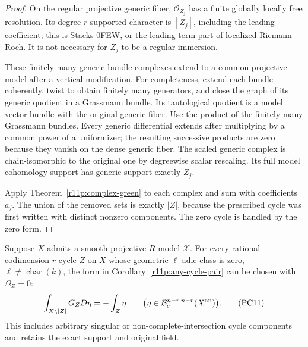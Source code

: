\begin{proof}
On the regular projective generic fiber, $\mathcal O_{Z_j}$ has a
finite globally locally free resolution.  Its degree-$r$ supported
character is $[Z_j]$, including the leading coefficient; this is
Stacks 0FEW, or the leading-term part of localized Riemann--Roch.
It is not necessary for $Z_j$ to be a regular immersion.

These finitely many generic bundle complexes extend to a common
projective model after a vertical modification.  For completeness,
extend each bundle coherently, twist to obtain finitely many generators,
and close the graph of its generic quotient in a Grassmann bundle.
Its tautological quotient is a model vector bundle with the original
generic fiber.  Use the product of the finitely many Grassmann bundles.
Every generic differential extends after multiplying by a common
power of a uniformizer; the resulting successive products are zero
because they vanish on the dense generic fiber.  The scaled generic
complex is chain-isomorphic to the original one by degreewise scalar
rescaling.  Its full model cohomology support has generic support
exactly $Z_j$.

Apply Theorem~\ref{r11p:complex-green} to each complex and sum with
coefficients $a_j$.  The union of the removed sets is exactly
$|Z|$, because the prescribed cycle was first written with distinct
nonzero components.  The zero cycle is handled by the zero form.
\end{proof}

\begin{corollary}
\label{r11p:good-reduction-G}
Suppose $X$ admits a smooth projective $R$-model $\mathcal X$.
For every rational codimension-$r$ cycle $Z$ on $X$ whose geometric
$\ell$-adic class is zero, $\ell\ne\operatorname{char}(k)$, the form
in Corollary~\ref{r11p:any-cycle-pair} can be chosen with
$\Omega_Z=0$:
\[
                  \int_{X\setminus|Z|}G_ZD\eta=-\int_Z\eta
       \qquad
       \bigl(\eta\in\mathcal B_c^{n-r,n-r}(X^{\rm an})\bigr).
\tag{PC11}\label{r11p:good-reduction-zero}
\]
This includes arbitrary singular or non-complete-intersection cycle
components and retains the exact support and original field.
\end{corollary}

